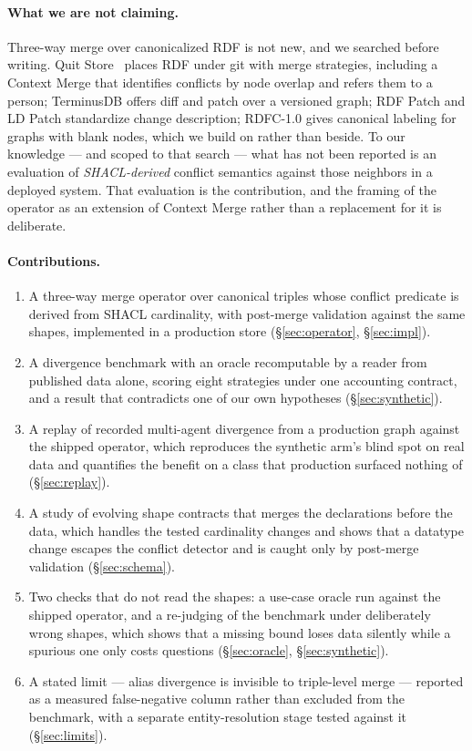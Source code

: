 \paragraph{What we are not claiming.} Three-way merge over canonicalized RDF is
not new, and we searched before writing. Quit Store~\cite{arndt2019quit} places
RDF under git with merge strategies, including a Context Merge that identifies
conflicts by node overlap and refers them to a person; TerminusDB offers diff and patch over a versioned graph; RDF
Patch and LD Patch standardize change description; RDFC-1.0 gives canonical
labeling for graphs with blank nodes, which we build on rather than beside. To
our knowledge --- and scoped to that search --- what has not been reported is an
evaluation of \emph{SHACL-derived} conflict semantics against those neighbors
in a deployed system. That evaluation is the contribution, and the framing of
the operator as an extension of Context Merge rather than a replacement for it
is deliberate.

\paragraph{Contributions.}
\begin{enumerate}[leftmargin=*,itemsep=2pt]
  \item A three-way merge operator over canonical triples whose conflict
        predicate is derived from SHACL cardinality, with post-merge validation
        against the same shapes, implemented in a production store
        (\S\ref{sec:operator}, \S\ref{sec:impl}).
  \item A divergence benchmark with an oracle recomputable by a reader from
        published data alone, scoring eight strategies under one accounting
        contract, and a result that contradicts one of our own hypotheses
        (\S\ref{sec:synthetic}).
  \item A replay of recorded multi-agent divergence from a production graph
        against the shipped operator, which reproduces the synthetic arm's
        blind spot on real data and quantifies the benefit on a class that
        production surfaced nothing of (\S\ref{sec:replay}).
  \item A study of evolving shape contracts that merges the declarations
        before the data, which handles the tested cardinality changes and
        shows that a datatype change escapes the conflict detector and is
        caught only by post-merge validation (\S\ref{sec:schema}).
  \item Two checks that do not read the shapes: a use-case oracle run against
        the shipped operator, and a re-judging of the benchmark under
        deliberately wrong shapes, which shows that a missing bound loses
        data silently while a spurious one only costs questions
        (\S\ref{sec:oracle}, \S\ref{sec:synthetic}).
  \item A stated limit --- alias divergence is invisible to triple-level merge
        --- reported as a measured false-negative column rather than excluded
        from the benchmark, with a separate entity-resolution stage tested
        against it (\S\ref{sec:limits}).
\end{enumerate}
